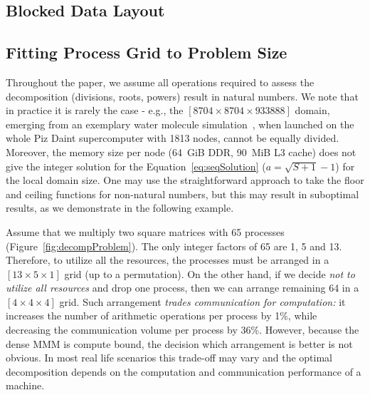 \documentclass[sigplan,review,anonymous]{acmart}\settopmatter{printfolios=true,printccs=false,printacmref=false}
\begin{document}
\subsection{Blocked Data Layout}
\label{sec:datalayout}



\subsection{Fitting Process Grid to Problem Size}
\label{sec:decompArbitrary}

Throughout the paper, we assume all operations required to 
assess the decomposition (divisions, roots, powers) result in natural 
numbers. We note that in practice it is rarely the case - e.g., the 
$[8704 \times 8704 \times 933888]$ domain, emerging from an exemplary 
water molecule simulation~\cite{joost}, when launched on the whole 
Piz Daint supercomputer with 1813 nodes, cannot be equally divided. 
Moreover, the memory size per 
node (64~GiB DDR, 90~MiB L3 cache) does not give the integer solution 
for the Equation~\ref{eq:seqSolution} ($a = \sqrt{S+1} -1$) for the 
local domain size. One may use the straightforward approach to take  
the floor and ceiling
functions for non-natural numbers, but this may result in suboptimal 
results, as we demonstrate in the following example.

Assume that we multiply two square matrices with 65 
processes (Figure~\ref{fig:decompProblem}). The only integer factors 
of 65 are 1, 5 and 13. Therefore, to 
utilize all the resources, the processes must be arranged in a $[13 
\times 5 \times 1]$ grid (up to a permutation). On the other hand, if 
we decide \emph{not to utilize all resources} 
and drop one process, then we can arrange remaining 64 in a $[4 
\times 4 \times 4]$ grid. Such arrangement \emph{trades communication 
	for computation:} it increases the number of arithmetic operations 
per process by 1\%, while decreasing the communication volume per 
process by 36\%. However, because the dense MMM is compute bound, the 
decision which arrangement is better is not obvious.
In most real life scenarios this trade-off may vary and the optimal 
decomposition depends on the computation and communication 
performance 
of a 
machine. 


\end{document}
